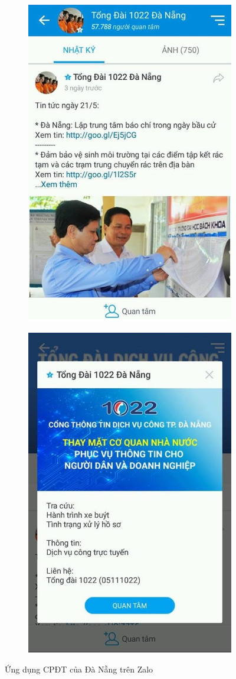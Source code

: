 \documentclass[a4paper]{article}
\begin{document}
\begin{figure}[h]
\centering
\begin{subfigure}{.5\textwidth}
  \centering
  \includegraphics[width=0.7\linewidth]{zalo-danang-1.jpg}
  \caption{}
\end{subfigure}%
\begin{subfigure}{.5\textwidth}
  \centering
  \includegraphics[width=0.7\linewidth]{zalo-danang-2.jpg}
  \caption{}
  \label{fig:sub2}
\end{subfigure}
\caption{Ứng dụng CPĐT của Đà Nẵng trên Zalo}
\end{figure}
\end{document}
